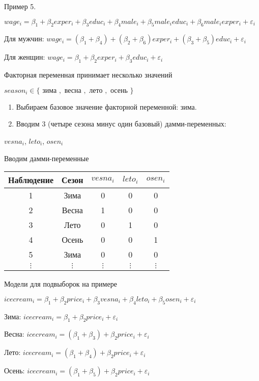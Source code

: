 \documentclass[russian,ignorenonframetext,]{beamer}
\begin{document}
\begin{frame}{Пример 5.}

\(wage_i = \beta_1 + \beta_2 exper_i + \beta_3 educ_i + \beta_4 male_i + \beta_5 male_i educ_i + \beta_6 male_i exper_i + \varepsilon_i\)

Для мужчин:
\(wage_i = (\beta_1+\beta_4) + (\beta_2 + \beta_6) exper_i + (\beta_3 + \beta_5) educ_i + \varepsilon_i\)

Для женщин:
\(wage_i = \beta_1 + \beta_2 exper_i + \beta_3 educ_i + \varepsilon_i\)

\end{frame}

\begin{frame}{Факторная переменная принимает несколько значений}

\(season_i \in \{\text{ зима }, \text{ весна }, \text{ лето }, \text{ осень } \}\)

\begin{enumerate}
\def\labelenumi{\arabic{enumi}.}
\item
  Выбираем базовое значение факторной переменной: зима.
\item
  Вводим 3 (четыре сезона минус один базовый) дамми-переменных:
\end{enumerate}

\(vesna_i\), \(leto_i\), \(osen_i\)

\end{frame}

\begin{frame}{Вводим дамми-переменные}

\begin{tabular}{ccccc}
\hline 
Наблюдение & Сезон & $vesna_i$ & $leto_i$ & $osen_i$  \\ 
\hline 
1 & Зима & 0 & 0 & 0 \\ 
2 & Весна & 1 & 0 & 0 \\ 
3 & Лето & 0 & 1 & 0 \\ 
4 & Осень & 0 & 0 & 1 \\ 
5 & Зима & 0 & 0 & 0 \\ 
$\vdots$ & $\vdots$ & $\vdots$ & $\vdots$ & $\vdots$ \\ 
\hline 
\end{tabular}

\end{frame}

\begin{frame}{Модели для подвыборок на примере}

\(icecream_i=\beta_1 + \beta_2 price_i + \beta_3 vesna_i + \beta_4 leto_i + \beta_5 osen_i + \varepsilon_i\)

Зима: \(icecream_i=\beta_1 + \beta_2 price_i + \varepsilon_i\)

Весна:
\(icecream_i=(\beta_1 + \beta_3) + \beta_2 price_i + \varepsilon_i\)

Лето:
\(icecream_i=(\beta_1 + \beta_4) + \beta_2 price_i + \varepsilon_i\)

Осень:
\(icecream_i=(\beta_1 + \beta_5) + \beta_2 price_i + \varepsilon_i\)

\end{frame}
\end{document}
